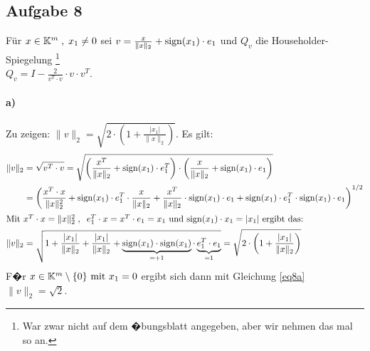 \subsection*{Aufgabe 8}
Für $x \in \mathbb K^m \; , \; x_1 \ne 0$ sei
$v = \frac{x}{\|x\|_2} + \mathrm{sign}(x_1) \cdot e_1$ und
$Q_v$  die Householder-Spiegelung
\footnote{War zwar nicht auf dem �bungsblatt angegeben, aber wir nehmen das mal so an.} \\
$Q_v = I - \frac{2}{v^T \cdot v} \cdot v \cdot v^T$.

\paragraph*{a)}
Zu zeigen: $\|v\|_2 = \sqrt{ 2 \cdot \left( 1 + \frac{|x_1|}{\|x\|_2} \right) }$. Es gilt:
\begin{align}
\nonumber
\|v\|_2 & = \sqrt{v^T \cdot v} =
  \sqrt{\left( \frac{x^T}{\|x\|_2} + \mathrm{sign}(x_1) \cdot e_1^T \right) \cdot \left( \frac{x}{\|x\|_2} + \mathrm{sign}(x_1) \cdot e_1 \right) } \\
\nonumber
  & = \left( \frac{x^T \cdot x }{\|x\|_2^2} + \mathrm{sign}(x_1) \cdot e_1^T \cdot \frac{x}{\|x\|_2} +
   \frac{x^T}{\|x\|_2} \cdot \mathrm{sign}(x_1) \cdot e_1  +  \mathrm{sign}(x_1) \cdot e_1^T \cdot \mathrm{sign}(x_1) \cdot e_1 \right)^{1/2}\\
  \intertext{Mit $x^T \cdot x = \| x \|_2^2 \; , \; \; e_1^T \cdot x = x^T \cdot e_1 = x_1$ und
    $\mathrm{sign}(x_1) \cdot x_1 = |x_1|$ ergibt das:}
  \label{eq8a}
 \|v\|_2 & = \sqrt {1 +  \frac{|x_1|}{\|x\|_2} + \frac{|x_1|}{\|x\|_2} +
  \underbrace{\mathrm{sign}(x_1) \cdot \mathrm{sign}(x_1) }_{ = +1} \cdot \underbrace{e_1^T \cdot e_1}_{ = 1} } =
   \sqrt{ 2 \cdot \left( 1 + \frac{|x_1|}{\|x\|_2} \right) }
\end{align}
F�r $x \in \mathbb K^m\setminus\{0\} \text{ mit } x_1 = 0$ ergibt sich dann
mit Gleichung \eqref{eq8a} $\|v\|_2 = \sqrt{2}$.


